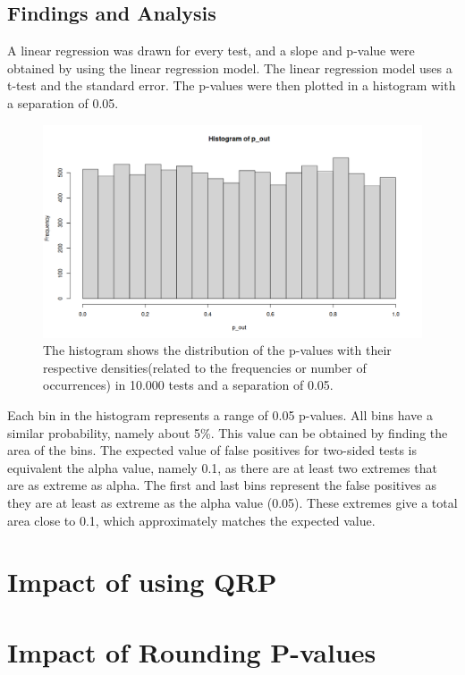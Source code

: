 \documentclass{article}
\begin{document}
\subsection{Findings and Analysis}

A linear regression was drawn for every test, and a slope and p-value were obtained by using the linear regression model. The linear regression model uses a t-test and the standard error. The p-values were then plotted in a histogram with a separation of 0.05.


\begin{figure}
    \centering
    \includegraphics[width=1\linewidth]{Assignment1/figures/plot.png}
    \caption{The histogram shows the distribution of the p-values with their respective densities(related to the frequencies or number of occurrences) in 10.000 tests and a separation of 0.05.}
    \label{fig:enter-label}
\end{figure}

Each bin in the histogram represents a range of 0.05 p-values. All bins have a similar probability, namely about 5\%. This value can be obtained by finding the area of the bins. The expected value of false positives for two-sided tests is equivalent the alpha value, namely 0.1, as there are at least two extremes that are as extreme as alpha. The first and last bins represent the false positives as they are at least as extreme as the alpha value (0.05). These extremes give a total area close to 0.1, which approximately matches the expected value.

\section{Impact of using QRP}

\section{Impact of Rounding P-values}
\end{document}
